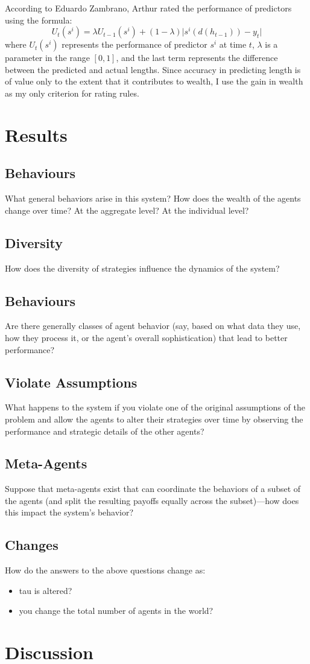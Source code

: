 \documentclass[]{article}
\begin{document}
According to Eduardo Zambrano\cite{zambrano2001boundedly}, Arthur rated the performance of predictors using the formula:
\begin{equation}
U_{t}(s^i)=\lambda U_{t-1}(s^i)+(1-\lambda)\lvert s^i(d(h_{t-1}))-y_t \rvert \label{eq:arthur}
\end{equation}
where $U_{t}(s^i)$ represents the performance of predictor $s^i$ at time $t$, $\lambda$ is a parameter in the range $[0,1]$, and the last term represents the difference between the predicted and actual lengths. Since accuracy in predicting length is of value only to the extent that it contributes to wealth, I use the gain in wealth as my only criterion for rating rules. 
\section{Results}

\subsection{Behaviours}What general behaviors arise in this system?  How does the wealth of the agents change over time? At the aggregate level? At the individual level?
\subsection{Diversity}How does the diversity of strategies influence the dynamics of the system?
\subsection{Behaviours}Are there generally classes of agent behavior (say, based on what data they use, how they process it, or the agent's overall sophistication) that lead to better performance?
\subsection{Violate Assumptions}What happens to the system if you violate one of the original assumptions of the problem and allow the agents to alter their strategies over time by observing the performance and strategic details of the other agents?
\subsection{Meta-Agents}Suppose that meta-agents exist that can coordinate the behaviors of a subset of the agents (and split the resulting payoffs equally across the subset)---how does this impact the system's behavior?
\subsection{Changes}How do the answers to the above questions change as:
\begin{itemize}
	\item tau is altered?
	\item you change the total number of agents in the world?
\end{itemize}

\section{Discussion}

\medskip



\end{document}
